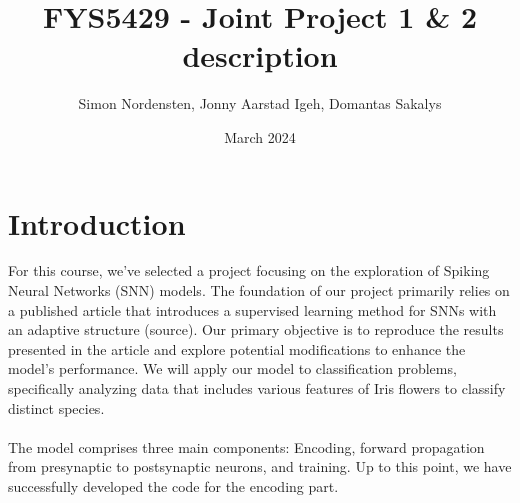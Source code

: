 \documentclass{article}
\title{FYS5429 - Joint Project 1 \& 2 description}
\author{Simon Nordensten, Jonny Aarstad Igeh, Domantas Sakalys}
\date{March 2024}
\begin{document}
\maketitle

\section*{Introduction}
For this course, we've selected a project focusing on the exploration of Spiking Neural Networks (SNN) models. The foundation of our project primarily relies on a published article that introduces a supervised learning method for SNNs with an adaptive structure (source). Our primary objective is to reproduce the results presented in the article and explore potential modifications to enhance the model's performance. We will apply our model to classification problems, specifically analyzing data that includes various features of Iris flowers to classify distinct species.
\\
\\
The model comprises three main components: Encoding, forward propagation from presynaptic to postsynaptic neurons, and training. Up to this point, we have successfully developed the code for the encoding part.
\end{document}
